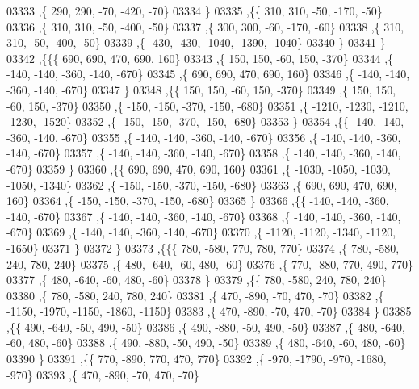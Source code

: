 \begin{DoxyCode}
03333     ,\{   290,   290,   -70,  -420,   -70\}
03334     \}
03335    ,\{\{   310,   310,   -50,  -170,   -50\}
03336     ,\{   310,   310,   -50,  -400,   -50\}
03337     ,\{   300,   300,   -60,  -170,   -60\}
03338     ,\{   310,   310,   -50,  -400,   -50\}
03339     ,\{  -430,  -430, -1040, -1390, -1040\}
03340     \}
03341    \}
03342   ,\{\{\{   690,   690,   470,   690,   160\}
03343     ,\{   150,   150,   -60,   150,  -370\}
03344     ,\{  -140,  -140,  -360,  -140,  -670\}
03345     ,\{   690,   690,   470,   690,   160\}
03346     ,\{  -140,  -140,  -360,  -140,  -670\}
03347     \}
03348    ,\{\{   150,   150,   -60,   150,  -370\}
03349     ,\{   150,   150,   -60,   150,  -370\}
03350     ,\{  -150,  -150,  -370,  -150,  -680\}
03351     ,\{ -1210, -1230, -1210, -1230, -1520\}
03352     ,\{  -150,  -150,  -370,  -150,  -680\}
03353     \}
03354    ,\{\{  -140,  -140,  -360,  -140,  -670\}
03355     ,\{  -140,  -140,  -360,  -140,  -670\}
03356     ,\{  -140,  -140,  -360,  -140,  -670\}
03357     ,\{  -140,  -140,  -360,  -140,  -670\}
03358     ,\{  -140,  -140,  -360,  -140,  -670\}
03359     \}
03360    ,\{\{   690,   690,   470,   690,   160\}
03361     ,\{ -1030, -1050, -1030, -1050, -1340\}
03362     ,\{  -150,  -150,  -370,  -150,  -680\}
03363     ,\{   690,   690,   470,   690,   160\}
03364     ,\{  -150,  -150,  -370,  -150,  -680\}
03365     \}
03366    ,\{\{  -140,  -140,  -360,  -140,  -670\}
03367     ,\{  -140,  -140,  -360,  -140,  -670\}
03368     ,\{  -140,  -140,  -360,  -140,  -670\}
03369     ,\{  -140,  -140,  -360,  -140,  -670\}
03370     ,\{ -1120, -1120, -1340, -1120, -1650\}
03371     \}
03372    \}
03373   ,\{\{\{   780,  -580,   770,   780,   770\}
03374     ,\{   780,  -580,   240,   780,   240\}
03375     ,\{   480,  -640,   -60,   480,   -60\}
03376     ,\{   770,  -880,   770,   490,   770\}
03377     ,\{   480,  -640,   -60,   480,   -60\}
03378     \}
03379    ,\{\{   780,  -580,   240,   780,   240\}
03380     ,\{   780,  -580,   240,   780,   240\}
03381     ,\{   470,  -890,   -70,   470,   -70\}
03382     ,\{ -1150, -1970, -1150, -1860, -1150\}
03383     ,\{   470,  -890,   -70,   470,   -70\}
03384     \}
03385    ,\{\{   490,  -640,   -50,   490,   -50\}
03386     ,\{   490,  -880,   -50,   490,   -50\}
03387     ,\{   480,  -640,   -60,   480,   -60\}
03388     ,\{   490,  -880,   -50,   490,   -50\}
03389     ,\{   480,  -640,   -60,   480,   -60\}
03390     \}
03391    ,\{\{   770,  -890,   770,   470,   770\}
03392     ,\{  -970, -1790,  -970, -1680,  -970\}
03393     ,\{   470,  -890,   -70,   470,   -70\}

\end{DoxyCode}

